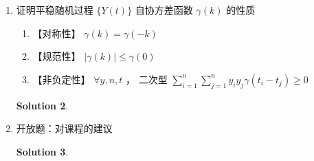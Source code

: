 \documentclass[a4paper,UTF8]{article}
\numberwithin{equation}{section}
\newtheorem*{mySol}{Solution}
\begin{document}
\begin{enumerate}
$$
V\left[Y_{N+\ell}-\hat{Y}_{N+\ell \mid N}\right]=\sigma^{2}\left(1+\frac{1}{N}\right)
$$


\begin{mySol}
	
	
	
\end{mySol}




\item 证明平稳随机过程 $\{Y(t)\}$ 自协方差函数 $\gamma(k)$ 的性质
\begin{enumerate}[1)]
	\item【对称性】 $\gamma(k)=\gamma(-k)$
	
	\item【规范性】 $|\gamma(k)| \leq \gamma(0)$
	
	\item【非负定性】 $\forall y, n, t$ ， 二次型 $\sum_{i=1}^{n} \sum_{j=1}^{n} y_{i} y_{j} \gamma\left(t_{i}-t_{j}\right) \geq 0$
\end{enumerate}


\begin{mySol}
	
	
	
\end{mySol}




\item 开放题：对课程的建议
	
	
\begin{mySol}
	
	
	
\end{mySol}

\end{enumerate}
\end{document}
